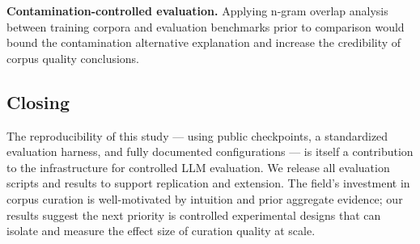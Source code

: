 \textbf{Contamination-controlled evaluation.} Applying n-gram overlap analysis~\cite{shi2024detecting} between training corpora and evaluation benchmarks prior to comparison would bound the contamination alternative explanation and increase the credibility of corpus quality conclusions.

\subsection{Closing}

The reproducibility of this study --- using public checkpoints, a standardized evaluation harness, and fully documented configurations --- is itself a contribution to the infrastructure for controlled LLM evaluation. We release all evaluation scripts and results to support replication and extension. The field's investment in corpus curation is well-motivated by intuition and prior aggregate evidence; our results suggest the next priority is controlled experimental designs that can isolate and measure the effect size of curation quality at scale.

